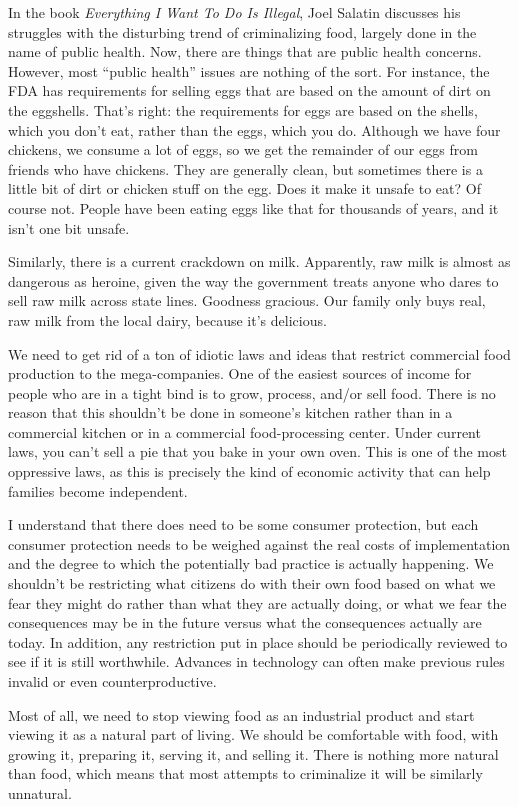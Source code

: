 \begin{policynote}
In the book \textit{Everything I Want To Do Is Illegal}, Joel Salatin
discusses his struggles with the disturbing trend of criminalizing
food, largely done in the name of public health. Now, there are things
that are public health concerns. However, most “public health” issues
are nothing of the sort. For instance, the FDA has requirements for
selling eggs that are based on the amount of dirt on the eggshells.
That’s right: the requirements for eggs are based on the shells, which
you don’t eat, rather than the eggs, which you do. Although we have
four chickens, we consume a lot of eggs, so we get the remainder of our
eggs from friends who have chickens. They are generally clean, but
sometimes there is a little bit of dirt or chicken stuff on the egg.
Does it make it unsafe to eat?  Of course not. People have been eating
eggs like that for thousands of years, and it isn’t one bit unsafe.

Similarly, there is a current crackdown on milk. Apparently, raw milk is
almost as dangerous as heroine, given the way the government treats
anyone who dares to sell raw milk across state lines. Goodness
gracious. Our family only buys real, raw milk from the local dairy,
because it’s delicious.

We need to get rid of a ton of idiotic laws and ideas that restrict
commercial food production to the mega-companies. One of the easiest
sources of income for people who are in a tight bind is to grow,
process, and/or sell food. There is no reason that this shouldn’t be
done in someone’s kitchen rather than in a commercial kitchen or in a
commercial food-processing center. Under current laws, you can’t sell a
pie that you bake in your own oven. This is one of the most oppressive
laws, as this is precisely the kind of economic activity that can help
families become independent.

I understand that there does need to be some consumer protection, but
each consumer protection needs to be weighed against the real costs of
implementation and the degree to which the potentially bad practice is
actually happening. We shouldn’t be restricting what citizens do with
their own food based on what we fear they might do rather than what
they are actually doing, or what we fear the consequences may be in the
future versus what the consequences actually are today. In addition,
any restriction put in place should be periodically reviewed to see if
it is still worthwhile. Advances in technology can often make previous
rules invalid or even counterproductive.

Most of all, we need to stop viewing food as an industrial product and
start viewing it as a natural part of living. We should be comfortable
with food, with growing it, preparing it, serving it, and selling it.
There is nothing more natural than food, which means that most attempts
to criminalize it will be similarly unnatural.
\end{policynote}

